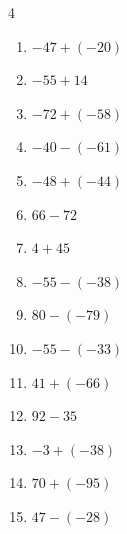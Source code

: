 \begin{multicols}{4}
\begin{enumerate}
        \phantom{$=-101$}

  \item $-47+(-20)$

        \phantom{$=-67$}

  \item $-55+14$

        \phantom{$=-41$}

  \item $-72+(-58)$

        \phantom{$=-130$}

  \item $-40-(-61)$

        \phantom{$=21$}

  \item $-48+(-44)$

        \phantom{$=-92$}

  \item $66-72$

        \phantom{$=-6$}

  \item $4+45$

        \phantom{$=49$}

  \item $-55-(-38)$

        \phantom{$=-17$}

  \item $80-(-79)$

        \phantom{$=159$}

  \item $-55-(-33)$

        \phantom{$=-22$}

  \item $41+(-66)$

        \phantom{$=-25$}

\columnbreak %

\resetques

  \item $92-35$

        \phantom{$=57$}

  \item $-3+(-38)$

        \phantom{$=-41$}

  \item $70+(-95)$

        \phantom{$=-25$}

  \item $47-(-28)$

        \phantom{$=75$}


\end{enumerate}
\end{multicols}
